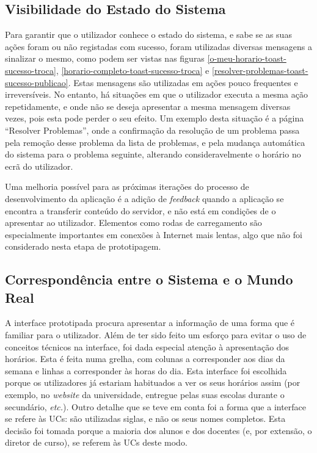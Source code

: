 \documentclass[12pt, a4paper]{article}
\begin{document}
\subsection{Visibilidade do Estado do Sistema}

Para garantir que o utilizador conhece o estado do sistema, e sabe se as suas ações foram ou não
registadas com sucesso, foram utilizadas diversas mensagens a sinalizar o mesmo, como podem ser
vistas nas figuras \ref{o-meu-horario-toast-sucesso-troca},
\ref{horario-completo-toast-sucesso-troca} e \ref{resolver-problemas-toast-sucesso-publicao}. Estas
mensagens são utilizadas em ações pouco frequentes e irreversíveis. No entanto, há situações em que
o utilizador executa a mesma ação repetidamente, e onde não se deseja apresentar a mesma mensagem
diversas vezes, pois esta pode perder o seu efeito. Um exemplo desta situação é a página
``Resolver Problemas'', onde a confirmação da resolução de um problema passa pela remoção desse
problema da lista de problemas, e pela mudança automática do sistema para o problema seguinte,
alterando consideravelmente o horário no ecrã do utilizador.

Uma melhoria possível para as próximas iterações do processo de desenvolvimento da aplicação é a
adição de \emph{feedback} quando a aplicação se encontra a transferir conteúdo do servidor, e não
está em condições de o apresentar ao utilizador. Elementos como rodas de carregamento são
especialmente importantes em conexões à Internet mais lentas, algo que não foi considerado nesta
etapa de prototipagem.

\subsection{Correspondência entre o Sistema e o Mundo Real}

A interface prototipada procura apresentar a informação de uma forma que é familiar para o
utilizador. Além de ter sido feito um esforço para evitar o uso de conceitos técnicos na interface,
foi dada especial atenção à apresentação dos horários. Esta é feita numa grelha, com colunas a
corresponder aos dias da semana e linhas a corresponder às horas do dia. Esta interface foi
escolhida porque os utilizadores já estariam habituados a ver os seus horários assim (por exemplo,
no \emph{website} da universidade, entregue pelas suas escolas durante o secundário, \emph{etc.}).
Outro detalhe que se teve em conta foi a forma que a interface se refere às UCs: são utilizadas
siglas, e não os seus nomes completos. Esta decisão foi tomada porque a maioria dos alunos e dos
docentes (e, por extensão, o diretor de curso), se referem às UCs deste modo.
\end{document}

